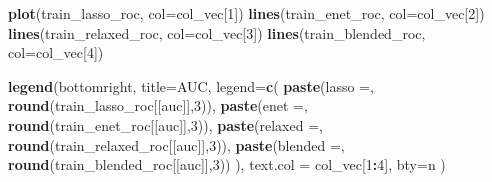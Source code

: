 \documentclass[
]{book}
\newenvironment{Shaded}{\begin{snugshade}}{\end{snugshade}}
\newcommand{\DataTypeTok}[1]{\textcolor[rgb]{0.13,0.29,0.53}{#1}}
\newcommand{\DecValTok}[1]{\textcolor[rgb]{0.00,0.00,0.81}{#1}}
\newcommand{\KeywordTok}[1]{\textcolor[rgb]{0.13,0.29,0.53}{\textbf{#1}}}
\newcommand{\NormalTok}[1]{#1}
\newcommand{\OperatorTok}[1]{\textcolor[rgb]{0.81,0.36,0.00}{\textbf{#1}}}
\newcommand{\StringTok}[1]{\textcolor[rgb]{0.31,0.60,0.02}{#1}}
\begin{document}
\begin{Shaded}
\begin{Highlighting}[]
\KeywordTok{plot}\NormalTok{(train\_lasso\_roc, }\DataTypeTok{col=}\NormalTok{col\_vec[}\DecValTok{1}\NormalTok{])}
\KeywordTok{lines}\NormalTok{(train\_enet\_roc, }\DataTypeTok{col=}\NormalTok{col\_vec[}\DecValTok{2}\NormalTok{])}
\KeywordTok{lines}\NormalTok{(train\_relaxed\_roc, }\DataTypeTok{col=}\NormalTok{col\_vec[}\DecValTok{3}\NormalTok{])}
\KeywordTok{lines}\NormalTok{(train\_blended\_roc, }\DataTypeTok{col=}\NormalTok{col\_vec[}\DecValTok{4}\NormalTok{])}

\KeywordTok{legend}\NormalTok{(}\StringTok{\textquotesingle{}bottomright\textquotesingle{}}\NormalTok{, }\DataTypeTok{title=}\StringTok{\textquotesingle{}AUC\textquotesingle{}}\NormalTok{,}
 \DataTypeTok{legend=}\KeywordTok{c}\NormalTok{(}
  \KeywordTok{paste}\NormalTok{(}\StringTok{\textquotesingle{}lasso =\textquotesingle{}}\NormalTok{, }\KeywordTok{round}\NormalTok{(train\_lasso\_roc[[}\StringTok{\textquotesingle{}auc\textquotesingle{}}\NormalTok{]],}\DecValTok{3}\NormalTok{)),}
  \KeywordTok{paste}\NormalTok{(}\StringTok{\textquotesingle{}enet =\textquotesingle{}}\NormalTok{, }\KeywordTok{round}\NormalTok{(train\_enet\_roc[[}\StringTok{\textquotesingle{}auc\textquotesingle{}}\NormalTok{]],}\DecValTok{3}\NormalTok{)),}
  \KeywordTok{paste}\NormalTok{(}\StringTok{\textquotesingle{}relaxed =\textquotesingle{}}\NormalTok{, }\KeywordTok{round}\NormalTok{(train\_relaxed\_roc[[}\StringTok{\textquotesingle{}auc\textquotesingle{}}\NormalTok{]],}\DecValTok{3}\NormalTok{)),}
  \KeywordTok{paste}\NormalTok{(}\StringTok{\textquotesingle{}blended =\textquotesingle{}}\NormalTok{, }\KeywordTok{round}\NormalTok{(train\_blended\_roc[[}\StringTok{\textquotesingle{}auc\textquotesingle{}}\NormalTok{]],}\DecValTok{3}\NormalTok{))}
\NormalTok{ ),}
 \DataTypeTok{text.col =}\NormalTok{ col\_vec[}\DecValTok{1}\OperatorTok{:}\DecValTok{4}\NormalTok{],}
 \DataTypeTok{bty=}\StringTok{\textquotesingle{}n\textquotesingle{}}
\NormalTok{)}
\end{Highlighting}
\end{Shaded}
\end{document}
